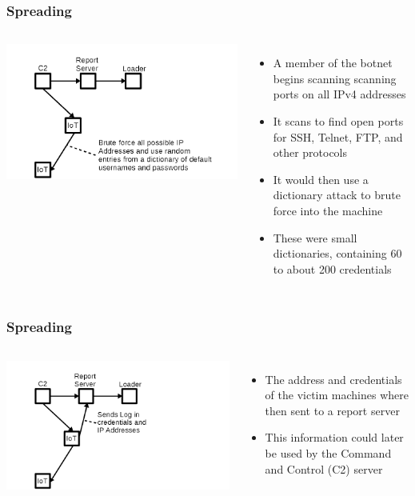 \documentclass{beamer}
\begin{document}
\begin{frame}
	\frametitle{Spreading}
	\begin{columns}
			\includegraphics[width=\textwidth]{fig1.png}
			\begin{itemize}
				\item<+-> A member of the botnet begins scanning scanning ports on all IPv4 addresses
				\item<+-> It scans to find open ports for SSH, Telnet, FTP, and other protocols
				\item<+-> It would then use a dictionary attack to brute force into the machine
				\item<+-> These were small dictionaries, containing 60 to about 200 credentials
			\end{itemize}
	\end{columns}
\end{frame}

\begin{frame}
	\frametitle{Spreading}
	\begin{columns}
		\column{0.5\linewidth}
			\includegraphics[width=\textwidth]{fig2.png}
		\column{0.5\linewidth}
			\begin{itemize}
				\item<+-> The address and credentials of the victim machines where then sent to a report server
				\item<+-> This information could later be used by the Command and Control (C2) server
			\end{itemize}
	\end{columns}
\end{frame}
\end{document}
